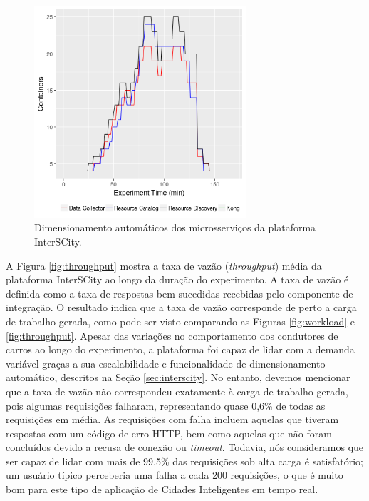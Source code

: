 \begin{figure}[ht]
	\centering
	\includegraphics[width=0.7\textwidth]{figuras/auto-scaling.png}
    \caption{Dimensionamento automáticos dos microsserviços da plataforma InterSCity.}
	\label{fig:auto-scaling}
\end{figure}


A Figura \ref{fig:throughput} mostra a taxa de vazão (\textit{throughput}) média da plataforma InterSCity ao longo da duração do experimento.
A taxa de vazão é definida como a taxa de respostas bem sucedidas recebidas pelo componente de integração.
O resultado indica que a taxa de vazão corresponde de perto a carga de trabalho gerada, como pode ser visto comparando as Figuras \ref{fig:workload} e \ref{fig:throughput}.
Apesar das variações no comportamento dos condutores de carros ao longo do experimento, a plataforma foi capaz de lidar com a demanda variável graças a sua escalabilidade e funcionalidade de dimensionamento
automático, descritos na Seção \ref{sec:interscity}.
No entanto, devemos mencionar que a taxa de vazão não correspondeu exatamente à carga de trabalho gerada, pois algumas requisições falharam, representando quase 0,6\% de todas as requisições em média.
As requisições com falha incluem aquelas que tiveram respostas com um código de erro HTTP, bem como aquelas que não foram concluídos devido a recusa de conexão ou \textit{timeout}.
Todavia, nós consideramos que ser capaz de lidar com mais de 99,5\% das requisições sob alta carga é satisfatório; um usuário típico perceberia uma falha a cada 200 requisições, o que é muito bom para
este tipo de aplicação de Cidades Inteligentes em tempo real.

